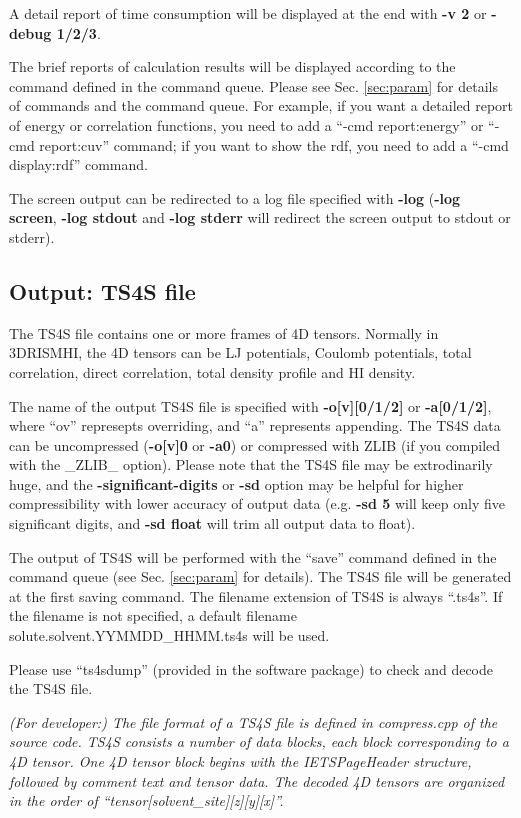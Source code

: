 \documentclass[aip,amsmath,amssymb,reprint,onecolumn]{revtex4-1}
\begin{document}
A detail report of time consumption will be displayed at the end with {\bf -v 2} or {\bf -debug 1/2/3}.

The brief reports of calculation results will be displayed according to the command defined in the command queue. Please see Sec. \ref{sec:param} for details of commands and the command queue. For example, if you want a detailed report of energy or correlation functions, you need to add a ``-cmd report:energy'' or ``-cmd report:cuv'' command; if you want to show the rdf, you need to add a ``-cmd display:rdf'' command.

The screen output can be redirected to a log file specified with {\bf -log} ({\bf -log screen}, {\bf -log stdout} and {\bf -log stderr} will redirect the screen output to stdout or stderr).

\subsection{Output: TS4S file}\label{sec:io.ts4s}

The TS4S file contains one or more frames of 4D tensors. Normally in 3DRISMHI, the 4D tensors can be LJ potentials, Coulomb potentials, total correlation, direct correlation, total density profile and HI density.

The name of the output TS4S file is specified with {\bf -o[v][0/1/2]} or {\bf -a[0/1/2]}, where ``ov'' represepts overriding, and ``a'' represents appending. The TS4S data can be uncompressed ({\bf -o[v]0} or {\bf -a0}) or compressed with ZLIB (if you compiled with the \_ZLIB\_ option). Please note that the TS4S file may be extrodinarily huge, and the {\bf -significant-digits} or {\bf -sd} option may be helpful for higher compressibility with lower accuracy of output data (e.g. {\bf -sd 5} will keep only five significant digits, and {\bf -sd float} will trim all output data to float).

The output of TS4S will be performed with the ``save'' command defined in the command queue (see Sec. \ref{sec:param} for details). The TS4S file will be generated at the first saving command. The filename extension of TS4S is always ``.ts4s''. If the filename is not specified, a default filename solute.solvent.YYMMDD\_HHMM.ts4s will be used.

Please use ``ts4sdump'' (provided in the software package) to check and decode the TS4S file.

{\it (For developer:) The file format of a TS4S file is defined in compress.cpp of the source code. TS4S consists a number of data blocks, each block corresponding to a 4D tensor. One 4D tensor block begins with the IETSPageHeader structure, followed by comment text and tensor data. The decoded 4D tensors are organized in the order of ``tensor[solvent\_site][z][y][x]''.}
\end{document}

